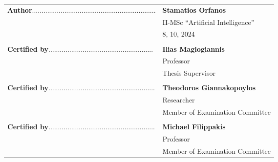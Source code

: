 \newpage
\thispagestyle{empty}


\begin{flushleft}
    \begin{tabularx}{\textwidth}{X l}
        \textbf{Author}................................................................. & \textbf{Stamatios Orfanos} \\
        & II-MSc “Artificial Intelligence” \\
        &  8, 10, 2024 \\
        \\
        \textbf{Certified by}....................................................... & \textbf{Ilias Maglogiannis} \\
        & Professor \\
        & Thesis Supervisor \\
        \\
        \textbf{Certified by}........................................................ & \textbf{Theodoros Giannakopoylos} \\
        & Researcher \\
        & Member of Examination Committee \\
        \\
        \textbf{Certified by}........................................................ & \textbf{Michael Filippakis} \\
        & Professor \\
        & Member of Examination Committee \\
    \end{tabularx}
\end{flushleft}
